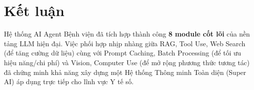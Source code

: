 \documentclass[12pt]{article}
\begin{document}
\section{Kết luận}

Hệ thống AI Agent Bệnh viện đã tích hợp thành công \textbf{8 module cốt lõi} của nền tảng LLM hiện đại. Việc phối hợp nhịp nhàng giữa RAG, Tool Use, Web Search (để tăng cường dữ liệu) cùng với Prompt Caching, Batch Processing (để tối ưu hiệu năng/chi phí) và Vision, Computer Use (để mở rộng phương thức tương tác) đã chứng minh khả năng xây dựng một Hệ thống Thông minh Toàn diện (Super AI) áp dụng trực tiếp cho lĩnh vực Y tế số.
\end{document}
